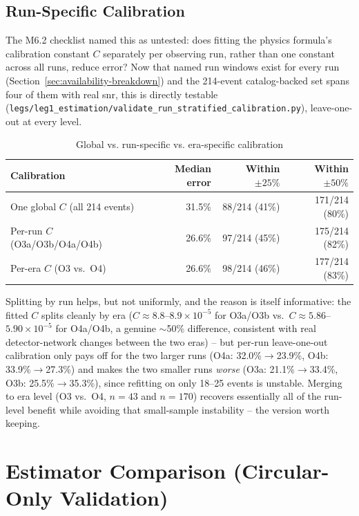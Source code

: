\subsection{Run-Specific Calibration}

The M6.2 checklist named this as untested: does fitting the physics formula's calibration constant $C$ separately per observing run, rather than one constant across all runs, reduce error? Now that named run windows exist for every run (Section~\ref{sec:availability-breakdown}) and the 214-event catalog-backed set spans four of them with real \gls{snr}, this is directly testable (\texttt{legs/leg1\_estimation/validate\_run\_stratified\_calibration.py}), leave-one-out at every level.

\begin{table}[H]
\centering
\caption{Global vs. run-specific vs. era-specific calibration}
\label{tab:run-calibration}
\begin{tabular}{@{}lrrr@{}}
\toprule
Calibration & Median error & Within $\pm25\%$ & Within $\pm50\%$ \\
\midrule
One global $C$ (all 214 events) & 31.5\% & 88/214 (41\%) & 171/214 (80\%) \\
Per-run $C$ (O3a/O3b/O4a/O4b) & 26.6\% & 97/214 (45\%) & 175/214 (82\%) \\
Per-era $C$ (O3 vs.\ O4) & 26.6\% & 98/214 (46\%) & 177/214 (83\%) \\
\bottomrule
\end{tabular}
\end{table}

Splitting by run helps, but not uniformly, and the reason is itself informative: the fitted $C$ splits cleanly by era ($C \approx 8.8$--$8.9\times10^{-5}$ for O3a/O3b vs.\ $C \approx 5.86$--$5.90\times10^{-5}$ for O4a/O4b, a genuine $\sim$50\% difference, consistent with real detector-network changes between the two eras) -- but per-run leave-one-out calibration only pays off for the two larger runs (O4a: 32.0\%$\to$23.9\%, O4b: 33.9\%$\to$27.3\%) and makes the two smaller runs \emph{worse} (O3a: 21.1\%$\to$33.4\%, O3b: 25.5\%$\to$35.3\%), since refitting on only 18--25 events is unstable. Merging to era level (O3 vs.\ O4, $n=43$ and $n=170$) recovers essentially all of the run-level benefit while avoiding that small-sample instability -- the version worth keeping.

\section{Estimator Comparison (Circular-Only Validation)}
\label{sec:estimator-comparison}


